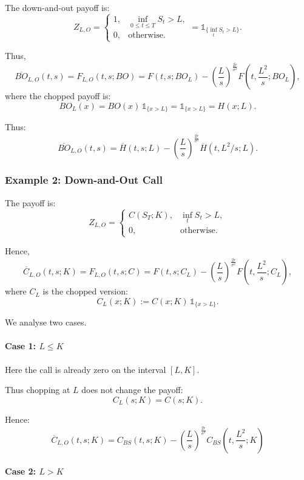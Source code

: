\documentclass[12pt,a4paper]{article}
\theoremstyle{definition}
\begin{document}
The down-and-out payoff is:
\[
Z_{L,O} = \begin{cases}
1, & \inf_{0 \leq t \leq T} S_t > L, \\
0, & \text{otherwise}.
\end{cases}
= \mathds{1}_{\{\inf_t S_t > L\}}.
\]

Thus,
\[
\overline{BO}_{L,O}(t, s) = F_{L,O}(t, s; BO) = F(t, s; BO_L) - \left(\frac{L}{s}\right)^{\frac{2\widetilde{r}}{\sigma^2}} F\!\left(t, \frac{L^2}{s}; BO_L\right),
\]
where the chopped payoff is:
\[
BO_L(x) = BO(x)\, \mathds{1}_{\{x > L\}} = \mathds{1}_{\{x > L\}} = H(x; L).
\]

Thus:
\[
\overline{BO}_{L,O}(t, s) = \overline{H}(t, s; L) - \left(\frac{L}{s}\right)^{\frac{2\widetilde{r}}{\sigma^2}} \overline{H}\!\left(t, L^2/s; L\right).
\]

\subsubsection{Example 2: Down-and-Out Call}

The payoff is:
\[
Z_{L,O} = \begin{cases}
C(S_T; K), & \inf_t S_t > L, \\
0, & \text{otherwise}.
\end{cases}
\]

Hence,
\[
\overline{C}_{L,O}(t, s; K) = F_{L,O}(t, s; C) = F(t, s; C_L) - \left(\frac{L}{s}\right)^{\frac{2\widetilde{r}}{\sigma^2}} F\!\left(t, \frac{L^2}{s}; C_L\right),
\]
where $C_L$ is the chopped version:
\[
C_L(x; K) := C(x; K)\, \mathds{1}_{\{x > L\}}.
\]

We analyse two cases.

\paragraph{Case 1: $L \leq K$}

Here the call is already zero on the interval $[L, K]$.

Thus chopping at $L$ does not change the payoff:
\[
C_L(s; K) = C(s; K).
\]

Hence:
\[
\overline{C}_{L,O}(t, s; K) = C_{BS}(t, s; K) - \left(\frac{L}{s}\right)^{\frac{2\widetilde{r}}{\sigma^2}} C_{BS}\!\left(t, \frac{L^2}{s}; K\right)
\]

\paragraph{Case 2: $L > K$}
\end{document}
